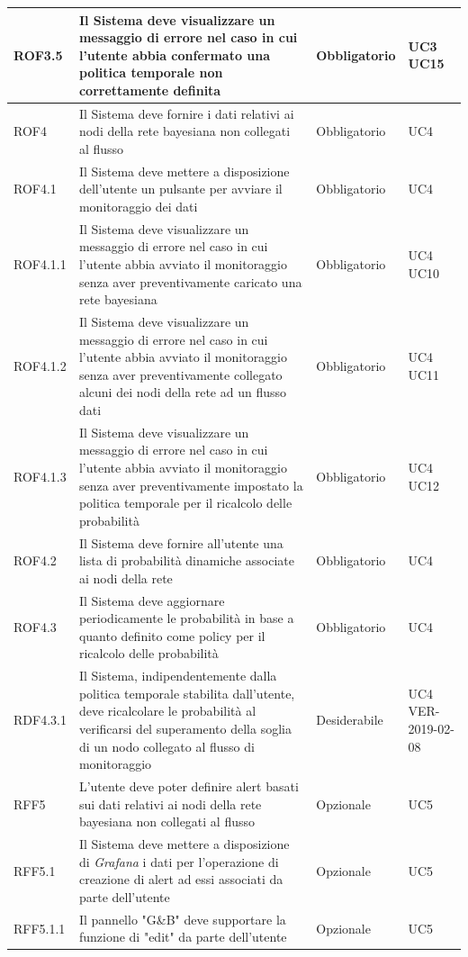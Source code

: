 \begin{center}
\begin{longtable}[c]{|m{}|m{}|m{}|m{}|}
\hline
\rowcolor{grigio}ROF3.5 & Il Sistema deve visualizzare un messaggio di errore nel caso in cui l'utente abbia confermato una politica temporale non correttamente definita & Obbligatorio & UC3 UC15\\
\hline
ROF4 & Il Sistema deve fornire i dati relativi ai nodi della rete bayesiana non collegati al flusso & Obbligatorio & UC4\\
\hline
\rowcolor{grigio}ROF4.1 & Il Sistema deve mettere a disposizione dell'utente un pulsante per avviare il monitoraggio dei dati & Obbligatorio & UC4\\
\hline
ROF4.1.1 & Il Sistema deve visualizzare un messaggio di errore nel caso in cui l'utente abbia avviato il monitoraggio senza aver preventivamente caricato una rete bayesiana & Obbligatorio & UC4 UC10\\
\hline
\rowcolor{grigio}ROF4.1.2 & Il Sistema deve visualizzare un messaggio di errore nel caso in cui l'utente abbia avviato il monitoraggio senza aver preventivamente collegato alcuni dei nodi della rete ad un flusso dati & Obbligatorio & UC4 UC11\\
\hline
ROF4.1.3 & Il Sistema deve visualizzare un messaggio di errore nel caso in cui l'utente abbia avviato il monitoraggio senza aver preventivamente impostato la politica temporale per il ricalcolo delle probabilità & Obbligatorio & UC4 UC12\\
\hline
\rowcolor{grigio}ROF4.2 & Il Sistema deve fornire all'utente una lista di probabilità dinamiche associate ai nodi della rete & Obbligatorio & UC4\\
\hline
ROF4.3 & Il Sistema deve aggiornare periodicamente le probabilità in base a quanto definito come policy per il ricalcolo delle probabilità & Obbligatorio & UC4\\
\hline
\rowcolor{grigio}RDF4.3.1 & Il Sistema, indipendentemente dalla politica temporale stabilita dall'utente, deve ricalcolare le probabilità al verificarsi del superamento della soglia di un nodo collegato al flusso di monitoraggio & Desiderabile & UC4 VER-2019-02-08\\
\hline
RFF5 & L'utente deve poter definire alert basati sui dati relativi ai nodi della rete bayesiana non collegati al flusso & Opzionale & UC5\\
\hline
\rowcolor{grigio}RFF5.1 & Il Sistema deve mettere a disposizione di \textit{Grafana} i dati per l'operazione di creazione di alert ad essi associati da parte dell'utente & Opzionale & UC5\\
\hline
RFF5.1.1 & Il pannello "G\&B" deve supportare la funzione di "edit" da parte dell'utente & Opzionale & UC5\\

\end{longtable}
\end{center}
